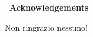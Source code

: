 \newenvironment{acknowledgements}%
{\cleardoublepage\fncyblank\null\vfill\begin{center}%
		\bfseries\Large\ Acknowledgements\end{center}}%
{\vfill\null}

\begin{titlepage}
	\begin{acknowledgements}
		Non ringrazio nessuno!
	\end{acknowledgements}
	\vfill
\end{titlepage}
\thispagestyle{empty}